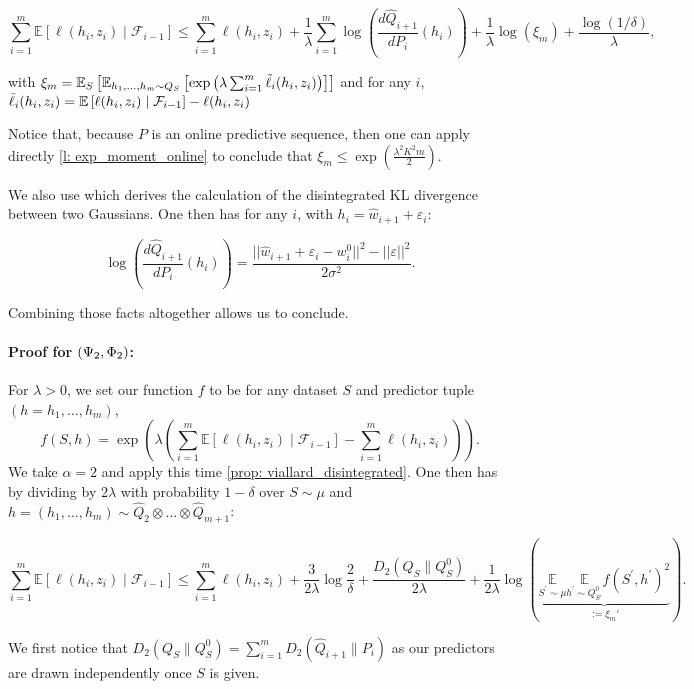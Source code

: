 \[ \sum_{i=1}^m  \mathbb{E}[\ell(h_i,z_i) \mid \mathcal{F}_{i-1}]   \leq \sum_{i=1}^m  \ell(h_i,z_i)  + \frac{1}{\lambda}\sum_{i=1}^m \log\left(\frac{d\hat{Q}_{i+1}}{dP_i}(h_i)\right) + \frac{1}{\lambda} \log(\xi_m) + \frac{\log(1/\delta)}{\lambda}, \]

with $  \xi_m = \mathbb{E}_S\left[\mathbb{E}_{h_1,...,h_m \sim Q_S} \left[\exp\left(\lambda \sum_{i=1}^m \Tilde{\ell}_i(h_i,z_i)\right)\right]\right]$ and for any $i$,
$ \Tilde{\ell}_i(h_i,z_i) = \mathbb{E}\left[\ell(h_i,z_i)\mid \mathcal{F}_{i-1}\right]-  \ell(h_i,z_i) $

Notice that, because $P$ is an online predictive sequence, then one can apply directly \cref{l: exp_moment_online} to conclude that $\xi_m \leq \exp \left( \frac{\lambda^2K^2m}{2} \right)$.

We also use \cite[Lemma 11]{viallard2023general} which derives the calculation of the disintegrated KL divergence between two Gaussians. One then has for any $i$, with $h_i= \hat{w}_{i+1} + \varepsilon_i$:

\[ \log\left(\frac{d\hat{Q}_{i+1}}{dP_i}(h_i)\right) = \frac{||\hat{w}_{i+1} + \varepsilon_i- w_i^0||^2 - ||\varepsilon||^2}{2\sigma^2}. \]

Combining those facts altogether allows us to conclude.


\paragraph{Proof for  $(\Psi_{\normalfont2},\Phi_{\normalfont2})$:}

For $\lambda>0$, we set our function $f$ to be for any dataset $S$ and predictor tuple $(h=h_1,...,h_m)$,
\[f(S,h) = \exp\left(\lambda \left(\sum_{i=1}^m \mathbb{E}\left[\ell(h_i,z_i)\mid \mathcal{F}_{i-1}\right]- \sum_{i=1}^m \ell(h_i,z_i) \right) \right).\]
We take $\alpha=2$ and apply this time \cref{prop: viallard_disintegrated}.
One then has by dividing by $2\lambda$ with probability $1-\delta$ over $S\sim \mu$ and $h=(h_1,...,h_m)\sim \hat{Q}_2\otimes ... \otimes \hat{Q}_{m+1}$:

\[\sum_{i=1}^m  \mathbb{E}[\ell(h_i,z_i) \mid \mathcal{F}_{i-1}]   \leq \sum_{i=1}^m  \ell(h_i,z_i)+   \frac{3}{2\lambda}\log \frac{2}{\delta}+\frac{D_{2}\left(Q_{S} \| Q_S^0\right)}{2\lambda}+ \frac{1}{2\lambda}
\log \left(\underbrace{\underset{S^{\prime} \sim \mu}{\mathbb{E}} \underset{h^{\prime} \sim Q_{S'}^0}{\mathbb{E}}
f\left(S^{\prime},h^{\prime}\right)^{2}}_{:= \xi_m'}\right). \]

We first notice that $D_{2}\left(Q_{S} \| Q_S^0\right) = \sum_{i=1}^m D_2(\hat{Q}_{i+1}\| P_i)$ as our predictors are drawn independently once $S$ is given.

